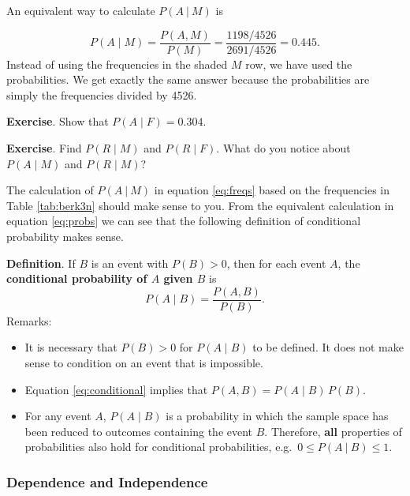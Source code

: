 \documentclass[
  british,
  11pt,
  openany, a4paper]{book}
\providecommand{\tightlist}{%
  \setlength{\itemsep}{0pt}\setlength{\parskip}{0pt}}
\begin{document}
An equivalent way to calculate \(P(A~|~M)\) is

\begin{equation}
P(A \mid M) = \frac{P(A, M)}{P(M)} = \frac{1198/4526}{2691/4526} = 0.445. \label{eq:probs}
\end{equation}
Instead of using the frequencies in the shaded \(M\) row, we have used the probabilities. We get exactly the same answer because the probabilities are simply the frequencies divided by 4526.

\textbf{Exercise}. Show that \(P(A \mid F)=0.304\).

\textbf{Exercise}. Find \(P(R \mid M)\) and \(P(R \mid F)\). What do you notice about \(P(A \mid M)\) and \(P(R \mid M)\)?

The calculation of \(P(A~|~M)\) in equation \eqref{eq:freqs} based on the frequencies in Table \ref{tab:berk3n} should make sense to you. From the equivalent calculation in equation \eqref{eq:probs} we can see that the following definition of conditional probability makes sense.

\textbf{Definition}. If \(B\) is an event with \(P(B) > 0\), then for each event \(A\), the \textbf{conditional probability of \(A\) given \(B\)} is
\begin{equation}
P(A \mid B)=\frac{P(A , B)}{P(B)}.
\label{eq:conditional}
\end{equation}
Remarks:

\begin{itemize}
\tightlist
\item
  It is necessary that \(P(B) > 0\) for \(P(A \mid B)\) to be defined. It does not make sense to condition on an event that is impossible.
\item
  Equation \eqref{eq:conditional} implies that \(P(A , B) = P(A \mid B)\,P(B)\).
\item
  For any event \(A\), \(P(A \mid B)\) is a probability in which the sample space has been reduced to outcomes containing the event \(B\). Therefore, \textbf{all} properties of probabilities also hold for conditional probabilities, e.g.~\(0 \leq P(A~|~B) \leq 1\).
\end{itemize}

\subsubsection*{Dependence and Independence}\label{dependence-and-independence}
\end{document}
